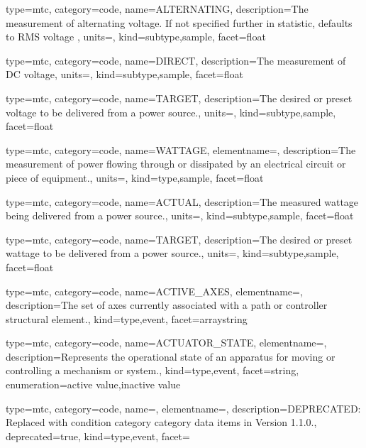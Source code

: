 {
  type=mtc,
  category=code,
  name={ALTERNATING},
  description={The measurement of alternating voltage.   If not specified further in statistic, defaults to RMS voltage  },
  units=,
  kind={subtype,sample},
  facet={\gls{float}}
}


{
  type=mtc,
  category=code,
  name={DIRECT},
  description={The measurement of DC voltage},
  units=,
  kind={subtype,sample},
  facet={\gls{float}}
}


{
  type=mtc,
  category=code,
  name={TARGET},
  description={The desired or preset voltage to be delivered from a power source.},
  units=,
  kind={subtype,sample},
  facet={\gls{float}}
}


{
  type=mtc,
  category=code,
  name={WATTAGE},
  elementname=,
  description={The measurement of power flowing through or dissipated by an electrical circuit or piece of equipment.},
  units=,
  kind={type,sample},
  facet={\gls{float}}
}


{
  type=mtc,
  category=code,
  name={ACTUAL},
  description={The measured wattage being delivered from a power source.},
  units=,
  kind={subtype,sample},
  facet={\gls{float}}
}


{
  type=mtc,
  category=code,
  name={TARGET},
  description={The desired or preset wattage to be delivered from a power source.},
  units=,
  kind={subtype,sample},
  facet={\gls{float}}
}


{
  type=mtc,
  category=code,
  name={ACTIVE\_AXES},
  elementname=,
  description={The set of axes currently associated with a \gls{path} or \gls{controller} \gls{structural element}.},
  kind={type,event},
  facet={\gls{arraystring}}
}


{
  type=mtc,
  category=code,
  name={ACTUATOR\_STATE},
  elementname=,
  description={Represents the operational state of an apparatus for moving or controlling a mechanism or system.},
  kind={type,event},
  facet={\gls{string}},
  enumeration={\gls{active value},\gls{inactive value}}
}


{
  type=mtc,
  category=code,
  name=,
  elementname=,
  description={DEPRECATED: Replaced with \gls{condition category} category data items in Version 1.1.0.},
  deprecated={true},
  kind={type,event},
  facet={}
}


